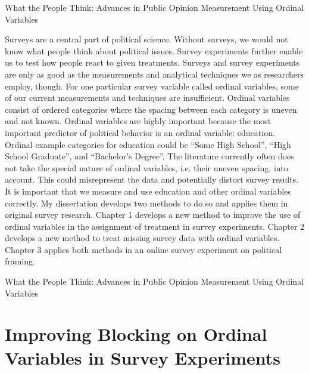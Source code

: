\documentclass[11pt]{article}
\begin{document}
\begin{center}
\Large
\textcolor{NavyBlue}{What the People Think: Advances in Public Opinion Measurement Using Ordinal Variables}\\
\vspace{0.3cm}
\large
{}
\end{center}

\doublespacing

Surveys are a central part of political science. Without surveys, we would not know what people think about political issues. Survey experiments further enable us to test how people react to given treatments. Surveys and survey experiments are only as good as the measurements and analytical techniques we as researchers employ, though. For one particular survey variable called ordinal variables, some of our current measurements and techniques are insufficient. Ordinal variables consist of ordered categories where the spacing between each category is uneven and not known. Ordinal variables are highly important because the most important predictor of political behavior is an ordinal variable: education. Ordinal example categories for education could be ``Some High School'', ``High School Graduate'', and ``Bachelor's Degree''. The literature currently often does not take the special nature of ordinal variables, i.e. their uneven spacing, into account. This could misrepresent the data and potentially distort survey results. It is important that we measure and use education and other ordinal variables correctly. My dissertation develops two methods to do so and applies them in original survey research. Chapter 1 develops a new method to improve the use of ordinal variables in the assignment of treatment in survey experiments. Chapter 2 develops a new method to treat missing survey data with ordinal variables. Chapter 3 applies both methods in an online survey experiment on political framing. 




\clearpage

\begin{center}
\Large
\textcolor{NavyBlue}{What the People Think: Advances in Public Opinion Measurement Using Ordinal Variables}\\
\vspace{0.3cm}
\large
{}
\end{center}


\section{Improving Blocking on Ordinal Variables in Survey Experiments}
\end{document}
